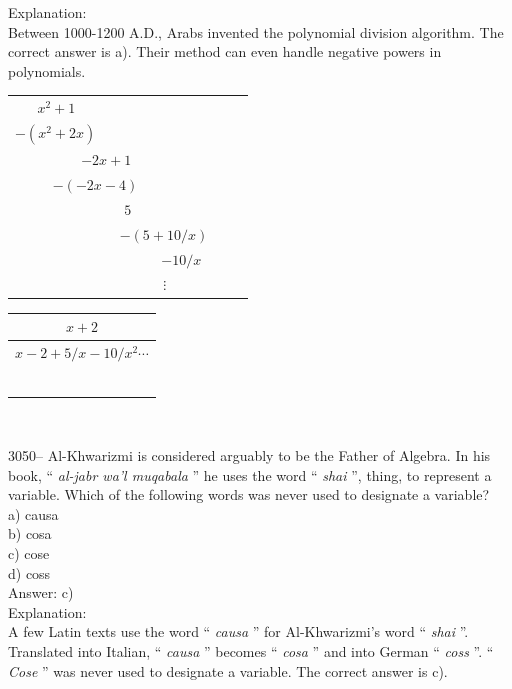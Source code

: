 \documentclass[letterpaper, 12pt]{article}
\begin{document}
Explanation:\\
Between 1000-1200 A.D., Arabs invented the polynomial division algorithm. The correct answer is a). Their method can even handle negative powers in polynomials.\\
\begin{center}
\begin{tabular}{r}
$x^{2} + 1$ \ \ \ \ \ \ \ \ \ \ \ \ \ \ \ \ \ \ \ \ \ \ \ \\
\underline{$- (x^{2} + 2x)$} \ \ \ \ \ \ \ \ \ \ \ \ \ \ \ \ \ \ \ \ \\
$- 2x + 1$ \ \ \ \ \ \ \ \ \ \ \ \ \ \ \ \\
\underline{$- (-2x - 4)$} \ \ \ \ \ \ \ \ \ \ \ \ \ \ \\
$5$ \ \ \ \ \ \ \ \ \ \ \ \ \ \ \ \\
\underline{$- (5 + 10/x)$} \ \ \ \ \\
$-10/x$ \ \ \ \ \ \\
$\vdots$ \ \ \ \ \ \ \ \ \ \
\end{tabular}
\begin{tabular}{|c}
$x + 2$ \\ \hline
$x - 2 + 5/x - 10/x^{2} \cdots$\\
\\
\\
\\
\\
\\
\\

\end{tabular}\\
\end{center}



3050-- Al-Khwarizmi is considered arguably to be the Father of Algebra. In his book, `` \emph{al-jabr wa'l muqabala} '' he uses the word `` \emph{shai} '', thing, to represent a variable. Which of the following words was never used to designate a variable?\\

a) causa\\
b) cosa\\
c) cose\\
d) coss\\

Answer: c)\\

Explanation:\\
A few Latin texts use the word `` \emph{causa} '' for Al-Khwarizmi's word `` \emph{shai} ''. Translated into Italian, `` \emph{causa} '' becomes `` \emph{cosa} '' and into German `` \emph{coss} ''. `` \emph{Cose} '' was never used to designate a variable. The correct answer is c).\\
\end{document}
